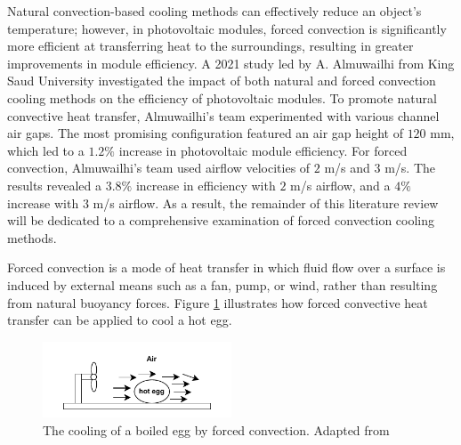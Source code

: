 Natural convection-based cooling methods can effectively reduce an object's temperature; however, in photovoltaic modules, forced convection is significantly more efficient at transferring heat to the surroundings, resulting in greater improvements in module efficiency. A 2021 study led by A. Almuwailhi from King Saud University investigated the impact of both natural and forced convection cooling methods on the efficiency of photovoltaic modules. To promote natural convective heat transfer, Almuwailhi's team experimented with various channel air gaps. The most promising configuration featured an air gap height of $120$ mm, which led to a $1.2\%$ increase in photovoltaic module efficiency. For forced convection, Almuwailhi's team used airflow velocities of $2$ m/s and $3$ m/s. The results revealed a $3.8\%$ increase in efficiency with $2$ m/s airflow, and a $4\%$ increase with $3$ m/s airflow. \cite{Almuwailhi2023InvestigatingRiyadh} As a result, the remainder of this literature review will be dedicated to a comprehensive examination of forced convection cooling methods.

Forced convection is a mode of heat transfer in which fluid flow over a surface is induced by external means such as a fan, pump, or wind, rather than resulting from natural buoyancy forces. \cite{Cengel2014IntroductionConcepts} Figure \ref{fig:cooling_of_boiled_egg_forced_convection} illustrates how forced convective heat transfer can be applied to cool a hot egg.\par

\begin{figure}[ht]
    \centering
    \includegraphics[width=0.5\textwidth, trim=0 5 0 10, clip]{Figures/cooling_of_boiled_egg_forced_convection.pdf}
    \caption{The cooling of a boiled egg by forced convection. Adapted from \cite{Cengel2014IntroductionConcepts}}
    \label{fig:cooling_of_boiled_egg_forced_convection}
\end{figure}


